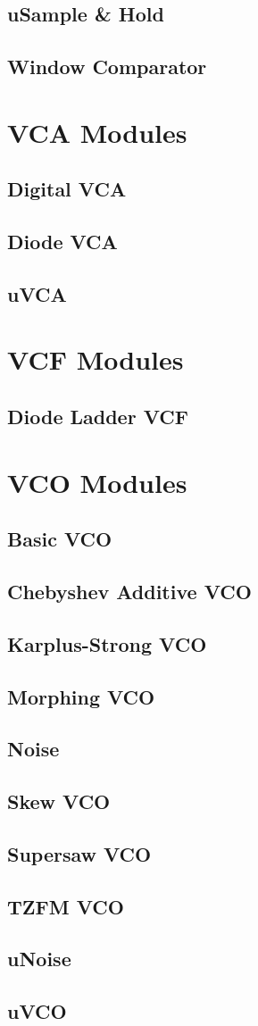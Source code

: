 \documentclass[11pt]{book}
\begin{document}
\section{uSample \& Hold}
\section{Window Comparator}

\chapter{VCA Modules}
\section{Digital VCA}
\section{Diode VCA}
\section{uVCA}

\chapter{VCF Modules}
\section{Diode Ladder VCF}

\chapter{VCO Modules}
\section{Basic VCO}
\section{Chebyshev Additive VCO}
\section{Karplus-Strong VCO}
\section{Morphing VCO}
\section{Noise}
\section{Skew VCO}
\section{Supersaw VCO}
\section{TZFM VCO}
\section{uNoise}
\section{uVCO}
\end{document}
